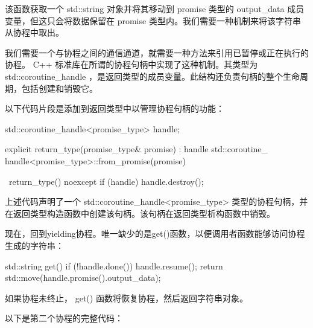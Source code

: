 该函数获取一个 std::string 对象并将其移动到 promise 类型的 output\_data 成员变量，但这只会将数据保留在 promise 类型内。我们需要一种机制来将该字符串从协程中取出。


我们需要一个与协程之间的通信通道，就需要一种方法来引用已暂停或正在执行的协程。 C++ 标准库在所谓的协程句柄中实现了这种机制。其类型为 std::coroutine\_handle ，是返回类型的成员变量。此结构还负责句柄的整个生命周期，包括创建和销毁它。

以下代码片段是添加到返回类型中以管理协程句柄的功能：

\begin{cpp}
std::coroutine_handle<promise_type> handle{};

explicit return_type(promise_type& promise) : handle{ std::coroutine_
    handle<promise_type>::from_promise(promise)} {
}

~return_type() noexcept {
    if (handle) {
        handle.destroy();
    }
}
\end{cpp}

上述代码声明了一个 std::coroutine\_handle<promise\_type> 类型的协程句柄，并在返回类型构造函数中创建该句柄。该句柄在返回类型析构函数中销毁。

现在，回到yielding协程。唯一缺少的是get()函数，以便调用者函数能够访问协程生成的字符串：

\begin{cpp}
std::string get() {
    if (!handle.done()) {
        handle.resume();
    }
    return std::move(handle.promise().output_data);
}
\end{cpp}

如果协程未终止， get() 函数将恢复协程，然后返回字符串对象。

以下是第二个协程的完整代码：


